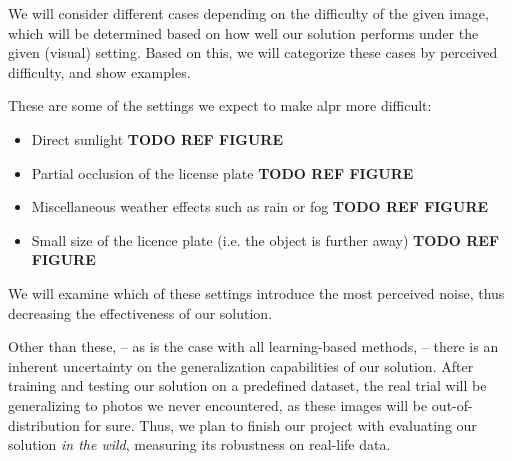 We will consider different cases depending on the difficulty of the given image,
which will be determined based on how well our solution performs under
the given (visual) setting. Based on this, we will categorize these cases by
perceived difficulty, and show examples.

These are some of the settings we expect to make \ac{alpr} more difficult:
\begin{itemize}
    \item Direct sunlight \textbf{TODO REF FIGURE}
    \item Partial occlusion of the license plate \textbf{TODO REF FIGURE}
    \item Miscellaneous weather effects such as rain or fog
            \textbf{TODO REF FIGURE}
    \item Small size of the licence plate (i.e. the object is further away)
        \textbf{TODO REF FIGURE}
\end{itemize}

We will examine which of these settings introduce the most perceived noise, thus
decreasing the effectiveness of our solution.

Other than these, -- as is the case with all learning-based methods, -- there is
an inherent uncertainty on the generalization capabilities of our solution.
After training and testing our solution on a predefined dataset, the real trial
will be generalizing to photos we never encountered, as these images will be
out-of-distribution for sure. Thus, we plan to finish our project with
evaluating our solution \textit{in the wild}, measuring its robustness on
real-life data.

